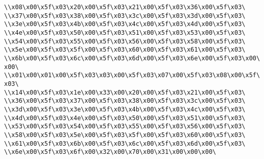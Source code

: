 \verb|\\x08\x00\x5f\x03\x20\x00\x5f\x03\x21\x00\x5f\x03\x36\x00\x5f\x03\|\newline
\verb|\\x37\x00\x5f\x03\x38\x00\x5f\x03\x3c\x00\x5f\x03\x3d\x00\x5f\x03\|\newline
\verb|\\x3e\x00\x5f\x03\x4b\x00\x5f\x03\x4c\x00\x5f\x03\x4d\x00\x5f\x03\|\newline
\verb|\\x4e\x00\x5f\x03\x50\x00\x5f\x03\x51\x00\x5f\x03\x53\x00\x5f\x03\|\newline
\verb|\\x54\x00\x5f\x03\x55\x00\x5f\x03\x56\x00\x5f\x03\x58\x00\x5f\x03\|\newline
\verb|\\x5e\x00\x5f\x03\x5f\x00\x5f\x03\x60\x00\x5f\x03\x61\x00\x5f\x03\|\newline
\verb|\\x6b\x00\x5f\x03\x6c\x00\x5f\x03\x6d\x00\x5f\x03\x6e\x00\x5f\x03\x00\x00\|\newline
\verb|\\x01\x00\x01\x00\x5f\x03\x03\x00\x5f\x03\x07\x00\x5f\x03\x08\x00\x5f\x03\|\newline
\verb|\\x14\x00\x5f\x03\x1e\x00\x33\x00\x20\x00\x5f\x03\x21\x00\x5f\x03\|\newline
\verb|\\x36\x00\x5f\x03\x37\x00\x5f\x03\x38\x00\x5f\x03\x3c\x00\x5f\x03\|\newline
\verb|\\x3d\x00\x5f\x03\x3e\x00\x5f\x03\x4b\x00\x5f\x03\x4c\x00\x5f\x03\|\newline
\verb|\\x4d\x00\x5f\x03\x4e\x00\x5f\x03\x50\x00\x5f\x03\x51\x00\x5f\x03\|\newline
\verb|\\x53\x00\x5f\x03\x54\x00\x5f\x03\x55\x00\x5f\x03\x56\x00\x5f\x03\|\newline
\verb|\\x58\x00\x5f\x03\x5e\x00\x5f\x03\x5f\x00\x5f\x03\x60\x00\x5f\x03\|\newline
\verb|\\x61\x00\x5f\x03\x6b\x00\x5f\x03\x6c\x00\x5f\x03\x6d\x00\x5f\x03\|\newline
\verb|\\x6e\x00\x5f\x03\x6f\x00\x32\x00\x70\x00\x31\x00\x00\x00\|\newline

